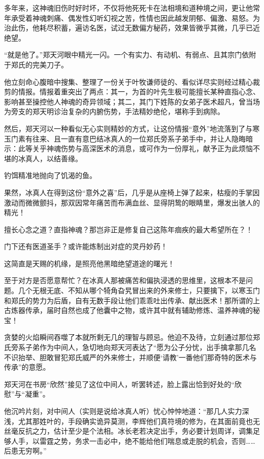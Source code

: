 多年来，这神魂旧伤时好时坏，不仅将他死死卡在法相境和道种境之间，更让他常年承受着神魂刺痛、偶发性幻听幻视之苦，性情也因此越发阴郁、偏激、易怒。为治此伤，他耗尽积蓄，遍访名医，试过无数偏方秘药，效果皆微乎其微，几乎已近绝望。

“就是他了。”郑天河眼中精光一闪。一个有实力、有动机、有弱点、且其宗门依附于郑氏的完美刀子。

他立刻命心腹暗中搜集、整理了一份关于叶牧谦师徒的、看似详尽实则经过精心裁剪的情报。情报着重突出了两点：其一，为首的叶先生极可能擅长某种直指心念、影响甚至操控他人神魂的奇异领域；其二，其门下姓陈的女弟子医术超凡，曾当场为旁支的郑天明诊治复杂的内腑伤势，手法精妙绝伦，堪称手到病除。

然后，郑天河以一种看似无心实则精妙的方式，让这份情报“意外”地流落到了与寒玉门素有往来、且一直有意巴结冰真人的一位郑氏旁系子弟手中，并让人隐晦暗示：此等关乎神魂伤势与高深医术的消息，或可作为一份厚礼，献予正为此烦恼不堪的冰真人，以结善缘。

钓饵精准地抛向了饥渴的鱼。

\vspace{2em}

果然，冰真人在得到这份“意外之喜”后，几乎是从座椅上弹了起来，枯瘦的手掌因激动而微微颤抖，那双因常年痛苦而布满血丝、显得阴鸷的眼睛里，爆发出骇人的精光！

擅长心念之道？直指神魂？那岂非正是修复自己这陈年痼疾的最大希望所在？！

门下还有医道圣手？或许能炼制出对症的灵丹妙药！

这简直是天赐的机缘，是照亮他黑暗绝望道途的曙光！

至于对方是否愿意帮忙？在冰真人那被痛苦和偏执浸透的思维里，这根本不是问题。几个无根无底、不知从哪个犄角旮旯冒出来的外来修士，只要擒下，以寒玉门和郑氏的势力为后盾，自有无数手段让他们乖乖吐出传承、献出医术！那所谓的上古炼器传承，届时自然也成了他囊中之物，或许其中就有辅助修炼、温养神魂的秘宝！

贪婪的火焰瞬间吞噬了本就所剩无几的理智与顾忌。他迫不及待，立刻通过那位郑氏旁系子弟作为中间人，急切地向郑天河表达了“愿为公子分忧，出手擒拿那几名不识抬举、胆敢冒犯郑氏威严的外来修士，并顺便‘请教’一番他们那奇特的医术与传承”的意愿。

郑天河在书房“欣然”接见了这位中间人，听罢转述，脸上露出恰到好处的“欣慰”与“凝重”。

他沉吟片刻，对中间人（实则是说给冰真人听）忧心忡忡地道：“那几人实力深浅，尤其那姓叶的，手段确实诡异莫测，李辉他们真符境的修为，在其面前竟也无丝毫反抗之力，估计至少是个法相。冰长老若决定出手，务必要计划周详，调集足够人手，以雷霆之势，务求一击必中，绝不能给他们喘息或走脱的机会，否则……后患无穷啊。”

